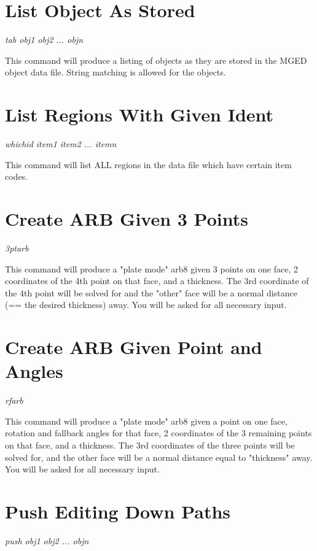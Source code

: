 \section{List Object As Stored}

{\em \center
tab obj1 obj2 ... objn
}

This command will produce a listing of objects as they are stored in
the MGED object data file.
String matching is allowed for the objects.

\section{List Regions With Given Ident}

{\em \center
whichid item1 item2 ... itemn
}

This command will list ALL regions in the data file which have certain
item codes.

\section{Create ARB Given 3 Points}

{\em \center
3ptarb
}

This command will produce a "plate mode" arb8 given 3 points on one face, 2 coordinates
of the 4th point on that face, and a thickness.
The 3rd coordinate of the 4th point will be solved for and the "other" face
will be a normal distance (== the desired thickness) away.
You will be asked for all necessary input.

\section{Create ARB Given Point and Angles}

{\em \center
rfarb
}

This command will produce a "plate mode" arb8 given a point on one face,
rotation and fallback angles for that face, 2 coordinates of the 3
remaining points on that face, and a thickness.
The 3rd coordinates of the three points will be solved for, and the other
face will be a normal distance equal to "thickness" away.
You will be asked for all necessary input.

\section{Push Editing Down Paths}

{\em \center
push obj1 obj2 ... objn
}


